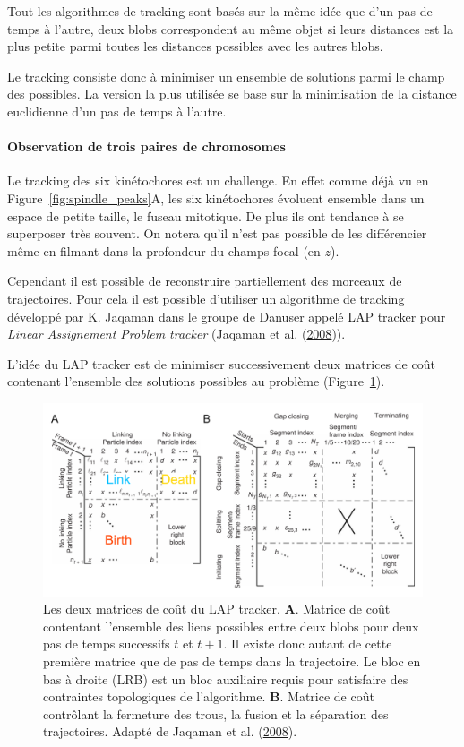 \documentclass[12pt,a4paper,twoside,openright]{book}
\let\oldparagraph\paragraph
\renewcommand{\paragraph}[1]{\oldparagraph{#1}\mbox{}}
\begin{document}
Tout les algorithmes de tracking sont basés sur la même idée que d'un
pas de temps à l'autre, deux blobs correspondent au même objet si leurs
distances est la plus petite parmi toutes les distances possibles avec
les autres blobs.

Le tracking consiste donc à minimiser un ensemble de solutions parmi le
champ des possibles. La version la plus utilisée se base sur la
minimisation de la distance euclidienne d'un pas de temps à l'autre.

\paragraph{Observation de trois paires de
chromosomes}\label{observation-de-trois-paires-de-chromosomes}

Le tracking des six kinétochores est un challenge. En effet comme déjà
vu en Figure~\ref{fig:spindle_peaks}A, les six kinétochores évoluent
ensemble dans un espace de petite taille, le fuseau mitotique. De plus
ils ont tendance à se superposer très souvent. On notera qu'il n'est pas
possible de les différencier même en filmant dans la profondeur du
champs focal (en \(z\)).

Cependant il est possible de reconstruire partiellement des morceaux de
trajectoires. Pour cela il est possible d'utiliser un algorithme de
tracking développé par K. Jaqaman dans le groupe de Danuser appelé LAP
tracker pour \emph{Linear Assignement Problem tracker} (Jaqaman et al.
(\protect\hyperlink{ref-Jaqaman2008}{2008})).

L'idée du LAP tracker est de minimiser successivement deux matrices de
coût contenant l'ensemble des solutions possibles au problème
(Figure~\ref{fig:jaqaman}).

\begin{figure}[htbp]
\centering
\includegraphics{figures/results/imaging/jaqaman.png}
\caption[Les deux matrices de coût du LAP tracker]{\label{fig:jaqaman}Les
deux matrices de coût du LAP tracker. \textbf{A}. Matrice de coût
contentant l'ensemble des liens possibles entre deux blobs pour deux pas
de temps successifs \(t\) et \(t+1\). Il existe donc autant de cette
première matrice que de pas de temps dans la trajectoire. Le bloc en bas
à droite (LRB) est un bloc auxiliaire requis pour satisfaire des
contraintes topologiques de l'algorithme. \textbf{B}. Matrice de coût
contrôlant la fermeture des trous, la fusion et la séparation des
trajectoires. Adapté de Jaqaman et al.
(\protect\hyperlink{ref-Jaqaman2008}{2008}).}
\end{figure}
\end{document}
